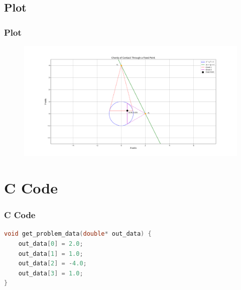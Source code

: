 \documentclass{beamer}
\theoremstyle{remark}
\numberwithin{equation}{section}
\begin{document}
\subsection{Plot}
\begin{frame}[fragile]
\frametitle{Plot}

\begin{figure}[h!]
   \centering
   \includegraphics[width=0.9\columnwidth]{figs/fig1.png}
	\caption{}
   \label{}
\end{figure}
\end{frame}

\section{C Code}
\begin{frame}[fragile]
\frametitle{C Code}
\begin{lstlisting}[language=C]
void get_problem_data(double* out_data) {
    out_data[0] = 2.0;
    out_data[1] = 1.0;
    out_data[2] = -4.0;
    out_data[3] = 1.0;
}


    \end{lstlisting}
\end{frame}
\end{document}
